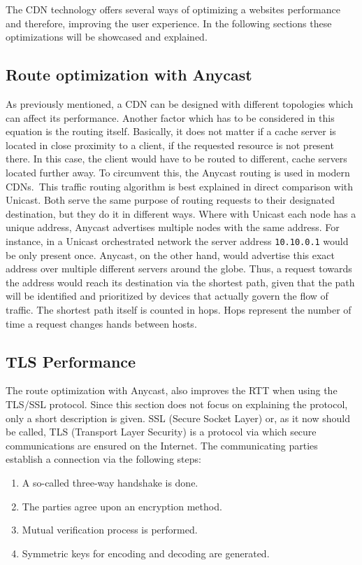 The CDN technology offers several ways of optimizing a websites performance and therefore, improving the user experience. In the following sections these optimizations will be showcased and explained.

\subsection{Route optimization with Anycast}

As previously mentioned, a CDN can be designed with different topologies which can affect its performance. Another factor which has to be considered in this equation is the routing itself. Basically, it does not matter if a cache server is located in close proximity to a client, if the requested resource is not present there. In this case, the client would have to be routed to different, cache servers located further away. 
To circumvent this, the Anycast routing is used in modern CDNs. This traffic routing algorithm is best explained in direct comparison with Unicast. Both serve the same purpose of routing requests to their designated destination, but they do it in different ways. Where with Unicast each node has a unique address, Anycast advertises multiple nodes with the same address.
For instance, in a Unicast orchestrated network the server address \texttt{10.10.0.1} would be only present once. Anycast, on the other hand, would advertise this exact address over multiple different servers around the globe. Thus, a request towards the address would reach its destination via the shortest path, given that the path will be identified and prioritized by devices that actually govern the flow of traffic.
The shortest path itself is counted in hops. Hops represent the number of time a request changes hands between hosts.\cite{cdn_route_opt}

\subsection{TLS Performance}

The route optimization with Anycast, also improves the RTT when using the TLS/SSL protocol. Since this section does not focus on explaining the protocol, only a short description is given.
SSL (Secure Socket Layer) or, as it now should be called, TLS (Transport Layer Security) is a protocol via which secure communications are ensured on the Internet. The communicating parties establish a connection via the following steps:

\begin{enumerate}[noitemsep]
	\item A so-called three-way handshake is done.
	\item The parties agree upon an encryption method.
	\item Mutual verification process is performed.
	\item Symmetric keys for encoding and decoding are generated.
\end{enumerate}

